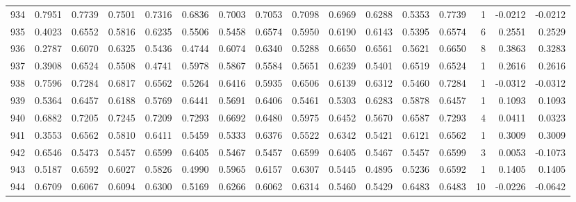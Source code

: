 \begin{tabular}{lrrrrrrrrrrrrrrr}
934 &      0.7951 &  0.7739 &  0.7501 &  0.7316 &  0.6836 &  0.7003 &  0.7053 &  0.7098 &  0.6969 &  0.6288 &   0.5353 &     0.7739 &      1 &                   -0.0212 &                    -0.0212 \\
935 &      0.4023 &  0.6552 &  0.5816 &  0.6235 &  0.5506 &  0.5458 &  0.6574 &  0.5950 &  0.6190 &  0.6143 &   0.5395 &     0.6574 &      6 &                    0.2551 &                     0.2529 \\
936 &      0.2787 &  0.6070 &  0.6325 &  0.5436 &  0.4744 &  0.6074 &  0.6340 &  0.5288 &  0.6650 &  0.6561 &   0.5621 &     0.6650 &      8 &                    0.3863 &                     0.3283 \\
937 &      0.3908 &  0.6524 &  0.5508 &  0.4741 &  0.5978 &  0.5867 &  0.5584 &  0.5651 &  0.6239 &  0.5401 &   0.6519 &     0.6524 &      1 &                    0.2616 &                     0.2616 \\
938 &      0.7596 &  0.7284 &  0.6817 &  0.6562 &  0.5264 &  0.6416 &  0.5935 &  0.6506 &  0.6139 &  0.6312 &   0.5460 &     0.7284 &      1 &                   -0.0312 &                    -0.0312 \\
939 &      0.5364 &  0.6457 &  0.6188 &  0.5769 &  0.6441 &  0.5691 &  0.6406 &  0.5461 &  0.5303 &  0.6283 &   0.5878 &     0.6457 &      1 &                    0.1093 &                     0.1093 \\
940 &      0.6882 &  0.7205 &  0.7245 &  0.7209 &  0.7293 &  0.6692 &  0.6480 &  0.5975 &  0.6452 &  0.5670 &   0.6587 &     0.7293 &      4 &                    0.0411 &                     0.0323 \\
941 &      0.3553 &  0.6562 &  0.5810 &  0.6411 &  0.5459 &  0.5333 &  0.6376 &  0.5522 &  0.6342 &  0.5421 &   0.6121 &     0.6562 &      1 &                    0.3009 &                     0.3009 \\
942 &      0.6546 &  0.5473 &  0.5457 &  0.6599 &  0.6405 &  0.5467 &  0.5457 &  0.6599 &  0.6405 &  0.5467 &   0.5457 &     0.6599 &      3 &                    0.0053 &                    -0.1073 \\
943 &      0.5187 &  0.6592 &  0.6027 &  0.5826 &  0.4990 &  0.5965 &  0.6157 &  0.6307 &  0.5445 &  0.4895 &   0.5236 &     0.6592 &      1 &                    0.1405 &                     0.1405 \\
944 &      0.6709 &  0.6067 &  0.6094 &  0.6300 &  0.5169 &  0.6266 &  0.6062 &  0.6314 &  0.5460 &  0.5429 &   0.6483 &     0.6483 &     10 &                   -0.0226 &                    -0.0642 \\

\end{tabular}
